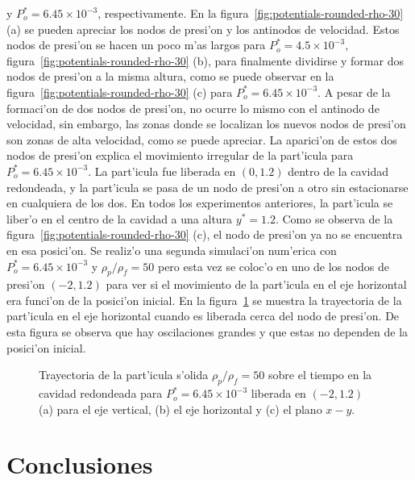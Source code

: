 y $P_o^\ast = 6.45\times 10^{-3}$, respectivamente. En la  figura~\ref{fig:potentials-rounded-rho-30} (a) 
se pueden apreciar los nodos de presi'on y los antinodos de velocidad. Estos nodos de presi'on se hacen
un poco m'as largos para  $P_o^\ast = 4.5\times 10^{-3}$, figura~\ref{fig:potentials-rounded-rho-30} (b), para
finalmente dividirse y formar dos nodos de presi'on a la misma altura, como se
puede observar en la  figura~\ref{fig:potentials-rounded-rho-30} (c) para  $P_o^\ast = 6.45\times 10^{-3}$. A pesar
de la formaci'on de dos nodos de presi'on, no ocurre lo mismo con el antinodo de velocidad, sin embargo, las zonas
donde se localizan los nuevos nodos de presi'on son zonas de alta velocidad, como se puede apreciar. La aparici'on de estos
dos nodos de presi'on explica el movimiento irregular de la part'icula para $P^\ast_o = 6.45 \times 10^{-3}$. La part'icula
fue liberada en $(0,1.2)$ dentro de la cavidad redondeada, y la part'icula se pasa de un nodo de presi'on a otro
sin estacionarse en cualquiera de los dos. En todos los experimentos anteriores, la part'icula se liber'o
en el centro de la cavidad a una altura  $y^\ast = 1.2$. Como se observa de la 
figura~\ref{fig:potentials-rounded-rho-30} (c), el nodo de presi'on ya no se encuentra en esa posici'on. Se realiz'o
una segunda simulaci'on num'erica con   $P_o^\ast = 6.45\times 10^{-3}$ y $\rho_p/\rho_f=50$ pero esta vez se 
coloc'o en uno de los nodos de presi'on $(-2,1.2)$ para ver si el movimiento de la part'icula en el eje horizontal
era funci'on de la posici'on inicial. En la figura~\ref{fig:paths-rho-30-rounded-x2} se muestra la trayectoria
de la part'icula en el eje horizontal cuando es liberada cerca del nodo de presi'on. De esta figura se observa que hay
oscilaciones grandes y que estas no dependen de la posici'on inicial. 
\begin{figure}



\caption{\label{fig:paths-rho-30-rounded-x2}
Trayectoria de la part'icula s'olida $\rho_p/\rho_f=50$ sobre el tiempo en la cavidad redondeada 
para $P_o^\ast = 6.45\times 10^{-3}$ liberada en $(-2,1.2)$ (a) para el eje vertical, (b) el 
eje horizontal y (c) el plano $x-y$.
}
\end{figure}


\section{Conclusiones}
\label{sec:conclusiones}

